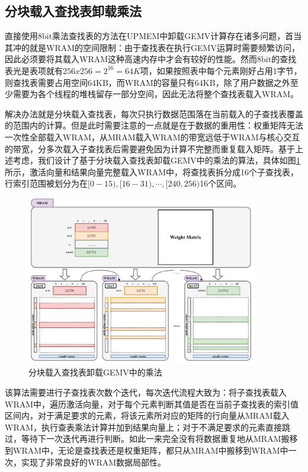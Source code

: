 \subsection{分块载入查找表卸载乘法}
直接使用8bit乘法查找表的方法在UPMEM中卸载GEMV计算存在诸多问题，首当其冲的就是WRAM的空间限制：由于查找表在执行GEMV运算时需要频繁访问，因此必须要将其载入WRAM这种高速内存中才会有较好的性能。然而8bit的查找表光是表项就有$256x256=2^{16}=64K$项，如果按照表中每个元素刚好占用1字节，则查找表需要占用空间64KB，而WRAM的容量只有64KB，除了用户数据之外至少需要为各个线程的堆栈留存一部分空间，因此无法将整个查找表载入WRAM。

解决办法就是分块载入查找表，每次只执行数据范围落在当前载入的子查找表覆盖的范围内的计算。但是此时需要注意的一点就是在于数据的重用性：权重矩阵无法一次性全部载入WRAM，从MRAM载入WRAM的带宽远低于WRAM与核心交互的带宽，分多次载入子查找表后需要避免因为计算不完整而重复载入矩阵。基于上述考虑，我们设计了基于分块载入查找表卸载GEMV中的乘法的算法，具体如图\ref{LUTBlock}所示，激活向量和结果向量完整载入WRAM中，将查找表拆分成16个子查找表，行索引范围被划分为在$[0-15),[16-31),\cdots,[240,256)$16个区间。

\begin{figure}[!htbp]
	\centering
    \includegraphics[width=0.9\textwidth]{figures/LUTBlock.pdf}
	\caption{分块载入查找表卸载GEMV中的乘法}
    \label{LUTBlock}
\end{figure}

该算法需要进行子查找表次数个迭代，每次迭代流程大致为：将子查找表载入WRAM中，遍历激活向量，对于每个元素判断其值是否在当前子查找表的索引值区间内，对于满足要求的元素，将该元素所对应的矩阵的行向量从MRAM载入WRAM，执行查表乘法计算并加到结果向量上；对于不满足要求的元素直接跳过，等待下一次迭代再进行判断。如此一来完全没有将数据重复地从MRAM搬移到WRAM中，无论是查找表还是权重矩阵，都只从MRAM中搬移到WRAM中一次，实现了非常良好的WRAM数据局部性。

